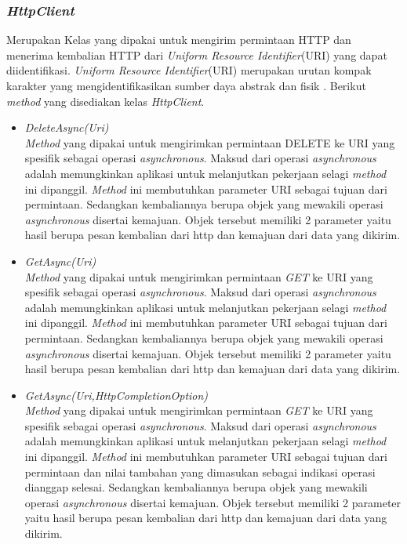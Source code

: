 \subsubsection{\textit{HttpClient}}
\label{subsubsec:Kelas HttpClient}
\hspace{0.5cm} Merupakan Kelas yang dipakai untuk mengirim permintaan HTTP dan menerima kembalian HTTP dari \textit{Uniform Resource Identifier}(URI) yang dapat diidentifikasi. \textit{Uniform Resource Identifier}(URI) merupakan urutan kompak karakter yang mengidentifikasikan sumber daya abstrak dan fisik \cite{rfc3986}. Berikut \textit{method} yang disediakan kelas \textit{HttpClient}.
\begin{itemize}
	\item \textit{DeleteAsync(Uri)} \\
	\textit{Method} yang dipakai untuk mengirimkan permintaan DELETE ke URI yang spesifik sebagai operasi \textit{asynchronous}. Maksud dari operasi \textit{asynchronous} adalah memungkinkan aplikasi untuk melanjutkan pekerjaan selagi \textit{method} ini dipanggil\footnotemark[2]. \textit{Method} ini membutuhkan parameter URI sebagai tujuan dari permintaan. Sedangkan kembaliannya berupa objek yang mewakili operasi \textit{asynchronous} disertai kemajuan. Objek tersebut memiliki 2 parameter yaitu hasil berupa pesan kembalian dari http dan kemajuan dari data yang dikirim.
	\item \textit{GetAsync(Uri)} \\
	\textit{Method} yang dipakai untuk mengirimkan permintaan \textit{GET} ke URI yang spesifik sebagai operasi \textit{asynchronous}. Maksud dari operasi \textit{asynchronous} adalah memungkinkan aplikasi untuk melanjutkan pekerjaan selagi \textit{method} ini dipanggil\footnotemark[2]. \textit{Method} ini membutuhkan parameter URI sebagai tujuan dari permintaan. Sedangkan kembaliannya berupa objek yang mewakili operasi \textit{asynchronous} disertai kemajuan. Objek tersebut memiliki 2 parameter yaitu hasil berupa pesan kembalian dari http dan kemajuan dari data yang dikirim.
	\item \textit{GetAsync(Uri,HttpCompletionOption)} \\
	\textit{Method} yang dipakai untuk mengirimkan permintaan \textit{GET} ke URI yang spesifik sebagai operasi \textit{asynchronous}. Maksud dari operasi \textit{asynchronous} adalah memungkinkan aplikasi untuk melanjutkan pekerjaan selagi \textit{method} ini dipanggil\footnotemark[2]. \textit{Method} ini membutuhkan parameter URI sebagai tujuan dari permintaan dan nilai tambahan yang dimasukan sebagai indikasi operasi dianggap selesai. Sedangkan kembaliannya berupa objek yang mewakili operasi \textit{asynchronous} disertai kemajuan. Objek tersebut memiliki 2 parameter yaitu hasil berupa pesan kembalian dari http dan kemajuan dari data yang dikirim.

\end{itemize}
